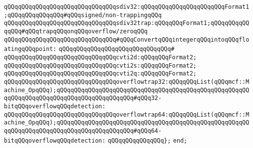 \verb|qQQqqQQqqQQqqQQqqQQqqQQqqQQqqQQqsdiv32:qQQqqQQqqQQqqQQqqQQqqQQqFormat1;qQQqqQQqqQQqqQQq#qQQqsigned/non-trappingqQQq|\newline
\verb|qQQqqQQqqQQqqQQqqQQqqQQqqQQqqQQqsdiv32trap:qQQqqQQqFormat1;qQQqqQQqqQQqqQQq#qQQqtrapqQQqonqQQqoverflow/zeroqQQq|\newline
\newline
\verb|qQQqqQQqqQQqqQQqqQQqqQQqqQQqqQQq#qQQqConvertqQQqintegerqQQqintoqQQqfloatingqQQqpoint:|\newline
\verb|qQQqqQQqqQQqqQQqqQQqqQQqqQQqqQQq#|\newline
\verb|qQQqqQQqqQQqqQQqqQQqqQQqqQQqqQQqcvti2d:qQQqqQQqFormat2;|\newline
\verb|qQQqqQQqqQQqqQQqqQQqqQQqqQQqqQQqcvti2s:qQQqqQQqFormat2;|\newline
\verb|qQQqqQQqqQQqqQQqqQQqqQQqqQQqqQQqcvti2q:qQQqqQQqFormat2;|\newline
\newline
\verb|qQQqqQQqqQQqqQQqqQQqqQQqqQQqqQQqoverflowtrap32:qQQqqQQqList(qQQqmcf::Machine_OpqQQq);qQQqqQQqqQQqqQQqqQQqqQQqqQQqqQQqqQQqqQQqqQQqqQQqqQQqqQQqqQQqqQQqqQQqqQQqqQQqqQQqqQQqqQQqqQQq#qQQq32-bitqQQqoverflowqQQqdetection:|\newline
\verb|qQQqqQQqqQQqqQQqqQQqqQQqqQQqqQQqoverflowtrap64:qQQqqQQqList(qQQqmcf::Machine_OpqQQq);qQQqqQQqqQQqqQQqqQQqqQQqqQQqqQQqqQQqqQQqqQQqqQQqqQQqqQQqqQQqqQQqqQQqqQQqqQQqqQQqqQQqqQQqqQQq#qQQq64-bitqQQqoverflowqQQqdetection:|\newline
\verb|qQQqqQQqqQQqqQQq};|\newline
\verb|end;|\newline

